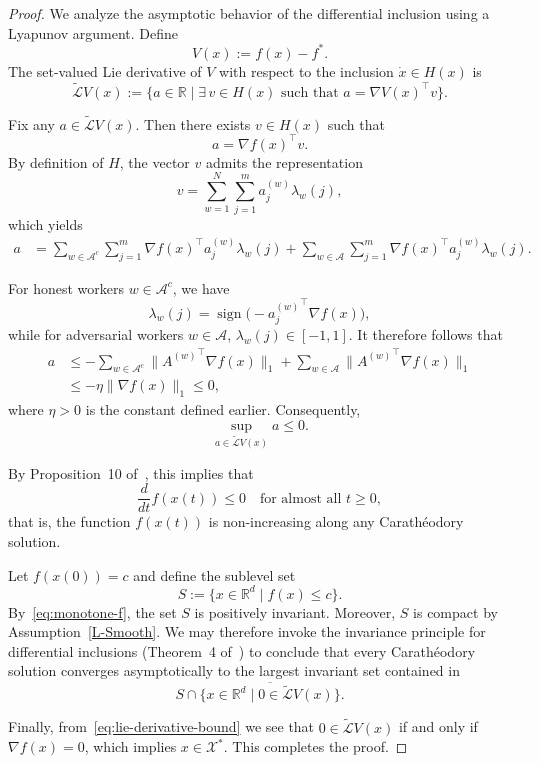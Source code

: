 \documentclass{article}
\begin{document}
\begin{proof}
We analyze the asymptotic behavior of the differential inclusion using a
Lyapunov argument. Define
\[
    V(x) := f(x) - f^\ast .
\]
The set-valued Lie derivative of $V$ with respect to the inclusion
$\dot{x} \in H(x)$ is
\[
    \widetilde{\mathcal{L}} V(x)
    :=
    \big\{
    a \in \mathbb{R}
    \;\big|\;
    \exists\, v \in H(x)
    \text{ such that }
    a = \nabla V(x)^\top v
    \big\}.
\]

Fix any $a \in \widetilde{\mathcal{L}} V(x)$. Then there exists $v \in H(x)$ such
that
\[
    a = \nabla f(x)^\top v .
\]
By definition of $H$, the vector $v$ admits the representation
\[
    v
    =
    \sum_{w=1}^{N} \sum_{j=1}^m a_j^{(w)} \lambda_w(j),
\]
which yields
\[
\begin{aligned}
    a
    &=
    \sum_{w \in \mathcal{A}^c}
    \sum_{j=1}^m
    \nabla f(x)^\top a_j^{(w)} \lambda_w(j)
    +
    \sum_{w \in \mathcal{A}}
    \sum_{j=1}^m
    \nabla f(x)^\top a_j^{(w)} \lambda_w(j).
\end{aligned}
\]

For honest workers $w \in \mathcal{A}^c$, we have
\[
    \lambda_w(j)
    =
    \operatorname{sign}\!\big(-{a_j^{(w)}}^\top \nabla f(x)\big),
\]
while for adversarial workers $w \in \mathcal{A}$, $\lambda_w(j) \in [-1,1]$. It
therefore follows that
\begin{equation}
\begin{split}
    a
    &\le
    - \sum_{w \in \mathcal{A}^c}
    \|{A^{(w)}}^\top \nabla f(x)\|_1
    +
    \sum_{w \in \mathcal{A}}
    \|{A^{(w)}}^\top \nabla f(x)\|_1
    \\
    &\le
    -\eta \|\nabla f(x)\|_1
    \le 0,
\end{split}
\label{eq:lie-derivative-bound}
\end{equation}
where $\eta>0$ is the constant defined earlier. Consequently,
\[
    \sup_{a \in \widetilde{\mathcal{L}} V(x)} a \le 0.
\]

By Proposition~10 of~\cite{cortes2008discontinuous1}, this implies that
\begin{equation}
    \frac{d}{dt} f(x(t)) \le 0
    \quad \text{for almost all } t \ge 0,
    \label{eq:monotone-f}
\end{equation}
that is, the function $f(x(t))$ is non-increasing along any Carath\'eodory
solution.

Let $f(x(0)) = c$ and define the sublevel set
\[
    S := \{ x \in \mathbb{R}^d \mid f(x) \le c \}.
\]
By~\eqref{eq:monotone-f}, the set $S$ is positively invariant. Moreover, $S$ is
compact by Assumption~\ref{L-Smooth}. We may therefore invoke the invariance
principle for differential inclusions (Theorem~4 of~\cite{cortes2008discontinuous1})
to conclude that every Carath\'eodory solution converges asymptotically to the
largest invariant set contained in
\[
    S \cap \overline{\{ x \in \mathbb{R}^d \mid 0 \in \widetilde{\mathcal{L}} V(x) \}}.
\]

Finally, from~\eqref{eq:lie-derivative-bound} we see that
$0 \in \widetilde{\mathcal{L}} V(x)$ if and only if $\nabla f(x) = 0$, which implies
$x \in \mathcal{X}^\ast$. This completes the proof.
\end{proof}
\end{document}
